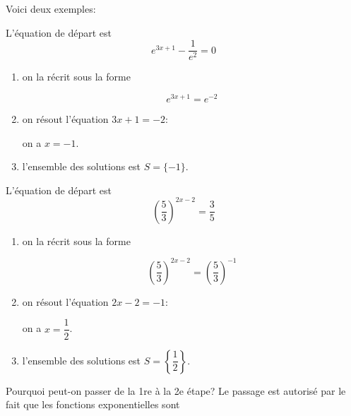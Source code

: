 \documentclass[a4paper,12pt,singlepage]{report}
\begin{document}
Voici deux exemples:
\par \setlength{\columnseprule}{2 pt}
          \begin{minipage}[t]{\linewidth}
          \begin{multicols}{2}
L'équation de départ est
\[
e^{3x+1}-\dfrac{1}{e^2}=0
\]

\begin{enumerate}
\item on la récrit sous la forme

\[
   e^{3x+1}=e^{-2}
   \]

\item on résout l'équation \(3x+1=-2\):

on a \(x=-1\).

\item l'ensemble des solutions est \(S=\{-1\}\).
\end{enumerate}
L'équation de départ est
\[
\left(\dfrac{5}{3}\right)^{2x-2}=\dfrac{3}{5}
\]

\begin{enumerate}
\item on la récrit sous la forme

\[
   \left(\dfrac{5}{3}\right)^{2x-2}=\left(\dfrac{5}{3}\right)^{-1}
   \]

\item on résout l'équation \(2x-2=-1\):

on a \(x=\dfrac{1}{2}\).

\item l'ensemble des solutions est \(S=\left\{\dfrac{1}{2}\right\}\).
\end{enumerate}


\end{multicols}\end{minipage}

\vspace{0.5cm}

Pourquoi peut-on passer de la 1re à la 2e étape? Le passage est autorisé par le
fait que les fonctions exponentielles sont \dotfill
\end{document}
